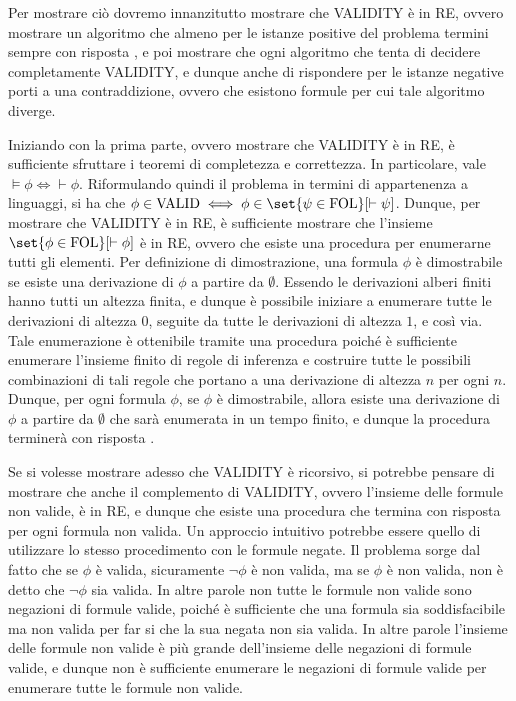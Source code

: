 Per mostrare ciò dovremo innanzitutto mostrare che VALIDITY è in RE, ovvero mostrare un algoritmo che almeno per le istanze positive del problema termini sempre con risposta , e poi mostrare che ogni algoritmo che tenta di decidere completamente VALIDITY, e dunque anche di rispondere  per le istanze negative porti a una contraddizione, ovvero che esistono formule per cui tale algoritmo diverge.

Iniziando con la prima parte, ovvero mostrare che VALIDITY è in RE, è sufficiente sfruttare i teoremi di completezza e correttezza. In particolare, vale \(\models \phi \iff \vdash \phi\). Riformulando quindi il problema in termini di appartenenza a linguaggi, si ha che \(\phi \in \Valid \iff \phi \in \set{\psi \in \FOL}[\vdash \psi]\). Dunque, per mostrare che VALIDITY è in RE, è sufficiente mostrare che l'insieme \(\set{\phi \in \FOL}[\vdash \phi]\) è in RE, ovvero che esiste una procedura per enumerarne tutti gli elementi. Per definizione di dimostrazione, una formula \(\phi\) è dimostrabile se esiste una derivazione di \(\phi\) a partire da \(\emptyset\). Essendo le derivazioni alberi finiti hanno tutti un altezza finita, e dunque è possibile iniziare a enumerare tutte le derivazioni di altezza \(0\), seguite da tutte le derivazioni di altezza \(1\), e così via. Tale enumerazione è ottenibile tramite una procedura poiché è sufficiente enumerare l'insieme finito di regole di inferenza e costruire tutte le possibili combinazioni di tali regole che portano a una derivazione di altezza \(n\) per ogni \(n\). Dunque, per ogni formula \(\phi\), se \(\phi\) è dimostrabile, allora esiste una derivazione di \(\phi\) a partire da \(\emptyset\) che sarà enumerata in un tempo finito, e dunque la procedura terminerà con risposta .

Se si volesse mostrare adesso che VALIDITY è ricorsivo, si potrebbe pensare di mostrare che anche il complemento di VALIDITY, ovvero l'insieme delle formule non valide, è in RE, e dunque che esiste una procedura che termina con risposta  per ogni formula non valida. Un approccio intuitivo potrebbe essere quello di utilizzare lo stesso procedimento con le formule negate. Il problema sorge dal fatto che se \(\phi\) è valida, sicuramente \(\neg \phi\) è non valida, ma se \(\phi\) è non valida, non è detto che \(\neg \phi\) sia valida. In altre parole non tutte le formule non valide sono negazioni di formule valide, poiché è sufficiente che una formula sia soddisfacibile ma non valida per far si che la sua negata non sia valida. In altre parole l'insieme delle formule non valide è più grande dell'insieme delle negazioni di formule valide, e dunque non è sufficiente enumerare le negazioni di formule valide per enumerare tutte le formule non valide. 

